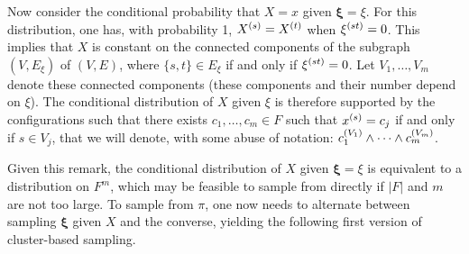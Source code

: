 \begin{enumerate}[label={\bf \alph*.}]
Now consider the conditional probability that $X = x$ given $\boldsymbol\xi = \xi$. For this distribution, one has, with probability 1, $X^{(s)} = X^{(t)}$ when $\xi^{(st)} = 0$. This implies that $X$ is constant on the connected components of the subgraph $(V, E_\xi)$ of $(V,E)$, where $\{s,t\} \in E_\xi$ if and only if $\xi^{(st)} = 0$. Let $V_1, \ldots, V_m$ denote these connected components (these components and their number depend on $\xi$). The conditional distribution of $X$ given $\xi$ is therefore supported by the configurations such that there exists $c_1, \ldots, c_m\in F$ such that $x^{(s)}= c_j$ if and only if $s\in V_j$, that we will denote, with some abuse of notation: $c_1^{(V_1)} \wedge \cdots \wedge c_m^{(V_m)}$.


Given this remark, the conditional distribution of $X$ given $\boldsymbol \xi = \xi$ is equivalent to a distribution on $F^m$, which may be feasible to sample from directly if $|F|$ and $m$ are not too large. To sample from $\pi$, one now needs to alternate between sampling $\boldsymbol\xi$ given $X$ and the converse, yielding the following first version of cluster-based sampling.


\end{enumerate}
